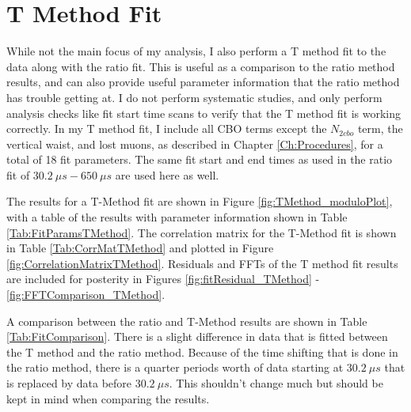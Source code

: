 \graphicspath{ {Figures/TMethod/Main/} {Figures/TMethod/ResidualsFFT/} {Figures/TMethod/Comparison/} {Figures/TMethod/RandomSeeds/} }

\chapter{T Method Fit}
\label{Ch:TMethod}

While not the main focus of my analysis, I also perform a T method fit to the data along with the ratio fit. This is useful as a comparison to the ratio method results, and can also provide useful parameter information that the ratio method has trouble getting at. I do not perform systematic studies, and only perform analysis checks like fit start time scans to verify that the T method fit is working correctly. In my T method fit, I include all CBO terms except the $N_{2cbo}$ term, the vertical waist, and lost muons, as described in Chapter \ref{Ch:Procedures}, for a total of 18 fit parameters. The same fit start and end times as used in the ratio fit of $\SI{30.2}{\mu s} - \SI{650}{\mu s}$ are used here as well.

The results for a T-Method fit are shown in Figure \ref{fig:TMethod_moduloPlot}, with a table of the results with parameter information shown in Table \ref{Tab:FitParamsTMethod}. The correlation matrix for the T-Method fit is shown in Table \ref{Tab:CorrMatTMethod} and plotted in Figure \ref{fig:CorrelationMatrixTMethod}. Residuals and FFTs of the T method fit results are included for posterity in Figures \ref{fig:fitResidual_TMethod} - \ref{fig:FFTComparison_TMethod}.

A comparison between the ratio and T-Method results are shown in Table \ref{Tab:FitComparison}. There is a slight difference in data that is fitted between the T method and the ratio method. Because of the time shifting that is done in the ratio method, there is a quarter \gmtwo periods worth of data starting at $\SI{30.2}{\mu s}$ that is replaced by data before $\SI{30.2}{\mu s}$. This shouldn't change much but should be kept in mind when comparing the results.

